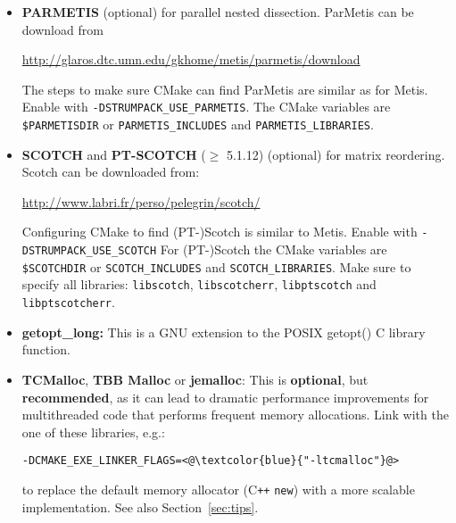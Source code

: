 \documentclass{article}
\begin{document}
\begin{itemize}
  \url{http://glaros.dtc.umn.edu/gkhome/metis/metis/download}.

  CMake looks for the Metis inlude files the library in the default
  locations as well as in
  \lstinline[style=Bash]!$METISDIR/include!  and
  \lstinline[style=Bash]!$METISDIR/lib!. Using the Bash shell, the
  METISDIR environment variable can be set as\\
  \lstinline[style=Bash]!export METISDIR=/usr/local/metis/!.
  Alternatively, you can specify the
  location of the header and library as follows:
  \begin{lstlisting}[style=Bash]
    > cmake <@\textcolor{blue}{../}@> -DCMAKE_BUILD_TYPE=<@\textcolor{blue}{Release}@> \
      -DMETIS_INCLUDES=<@\textcolor{blue}{/usr/local/metis/include}@> \
      -DMETIS_LIBRARIES=<@\textcolor{blue}{/usr/local/metis/lib/libmetis.a}@>
  \end{lstlisting}

\item \textbf{PARMETIS} (optional) for parallel nested
  dissection. ParMetis can be download from

  \url{http://glaros.dtc.umn.edu/gkhome/metis/parmetis/download}

  The steps to make sure CMake can find ParMetis are similar as for
  Metis. Enable with \lstinline[style=Bash]!-DSTRUMPACK_USE_PARMETIS!.
  The CMake variables are
  \lstinline[style=Bash]!$PARMETISDIR! or
  \lstinline[style=Bash]!PARMETIS_INCLUDES! and
  \lstinline[style=Bash]!PARMETIS_LIBRARIES!.

\item \textbf{SCOTCH} and \textbf{PT-SCOTCH}
  ($\geq$ 5.1.12) (optional) for matrix reordering. Scotch can be
  downloaded from:

  \url{http://www.labri.fr/perso/pelegrin/scotch/}

  Configuring CMake to find (PT-)Scotch is similar to Metis. Enable
  with \lstinline[style=Bash]!-DSTRUMPACK_USE_SCOTCH! For (PT-)Scotch
  the CMake variables are
  \lstinline[style=Bash]!$SCOTCHDIR! or
  \lstinline[style=Bash]!SCOTCH_INCLUDES! and
  \lstinline[style=Bash]!SCOTCH_LIBRARIES!. Make sure to specify all
  libraries: \lstinline[style=Bash]!libscotch!,
  \lstinline[style=Bash]!libscotcherr!,
  \lstinline[style=Bash]!libptscotch! and
  \lstinline[style=Bash]!libptscotcherr!.

\item \textbf{getopt\_long:} This is a GNU extension to the POSIX
  getopt() C library function.
\item \textbf{TCMalloc}, \textbf{TBB Malloc} or \textbf{jemalloc}:
  This is \textbf{optional}, but \textbf{recommended}, as it can lead
  to dramatic performance improvements for multithreaded code that
  performs frequent memory allocations. Link with the one of these
  libraries, e.g.:
  \begin{lstlisting}[style=Bash]
  -DCMAKE_EXE_LINKER_FLAGS=<@\textcolor{blue}{"-ltcmalloc"}@>
  \end{lstlisting}
  to replace the default memory allocator (C\texttt{++} \texttt{new})
  with a more scalable implementation. See also
  Section~\ref{sec:tips}.
\end{itemize}
\end{document}
